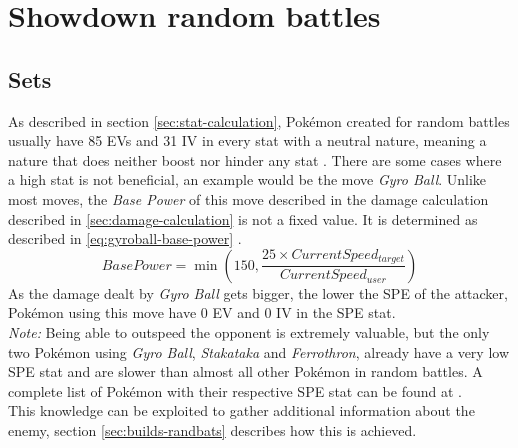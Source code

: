 \section{Showdown random battles}
\label{sec:showdown-randbats}
\subsection{Sets}
\label{sec:randbats-sets}
As described in section \ref{sec:stat-calculation}, Pokémon created for random battles
usually have 85 \ac{EV}s and 31 \ac{IV} in every stat with a neutral nature, 
meaning a nature that does neither boost nor hinder any stat \cite{Smogon:RandBatsGuide}.
There are some cases where a high stat is not beneficial, an example would be the 
move \textit{Gyro Ball}. Unlike most moves, the \textit{Base Power} of this move
described in the damage calculation described in \ref{sec:damage-calculation} is not
a fixed value. It is determined as described in \ref{eq:gyroball-base-power} \cite{Bulbapedia:GyroBall}.
\begin{equation}
	\label{eq:gyroball-base-power}
	BasePower = \min(150, \frac{25 \times CurrentSpeed_{target}}{CurrentSpeed_{user}})
\end{equation} 
As the damage dealt by \textit{Gyro Ball} gets bigger, the lower the \ac{SPE} of the
attacker, Pokémon using this move have 0 \ac{EV} and 0 \ac{IV} in the \ac{SPE} stat. \\
\textit{Note:} Being able to outspeed the opponent is extremely valuable, but the only
two Pokémon using \textit{Gyro Ball}, \textit{Stakataka} and \textit{Ferrothron}, already
have a very low \ac{SPE} stat and are slower than almost all other Pokémon in random
battles. A complete list of Pokémon with their respective \ac{SPE} stat can be found
at \cite{Bulbapedia:PokemonBySpeed}. \\
This knowledge can be exploited to gather additional information about the enemy, section
\ref{sec:builds-randbats} describes how this is achieved.

